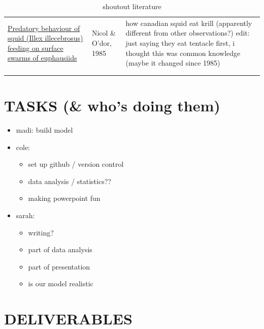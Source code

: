 \documentclass[12pt]{article}
\begin{document}
\begin{longtable}{p{2.0in}|p{1.0in}|p{2.5in}}
        \href{https://cdnsciencepub.com/doi/abs/10.1139/z85-003?casa_token=bqmjjmJ0cKEAAAAA:WwqN4ggP8UB-tploMwL8HRw3yJYGMCQLuByca4VsFl7IuEsnIVroR8C_c-qpgDbPYlPSr6QztWM}{Predatory behaviour of squid (Illex illecebrosus) feeding on surface swarms of euphausiids} & Nicol \& O'dor, 1985 & how canadian squid eat krill (apparently different from other observations?) edit: just saying they eat tentacle first, i thought this was common knowledge (maybe it changed since 1985) \\ \\
    
    \caption{shoutout literature}
\end{longtable}

\section{TASKS (\& who's doing them)}
\begin{itemize}
    \item madi: build model
    \item cole:
    \begin{itemize}
        \item set up github / version control
        \item data analysis / statistics??
        \item making powerpoint fun
    \end{itemize}
    \item sarah: 
        \begin{itemize}
            \item writing?
            \item part of data analysis
            \item part of presentation
            \item is our model realistic
        \end{itemize}
        
\end{itemize}

\section{DELIVERABLES}
\end{document}
